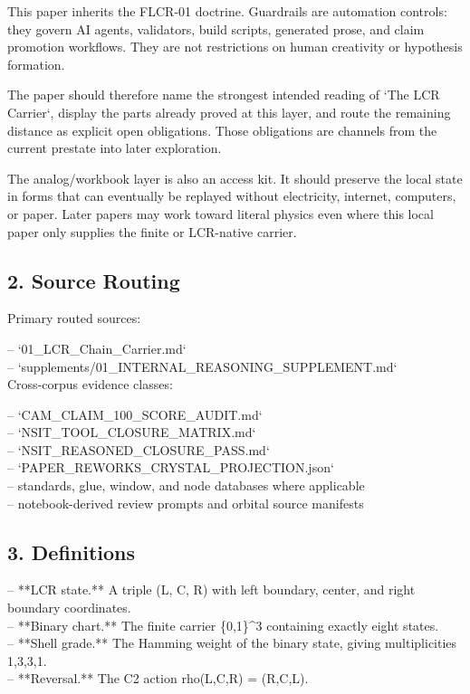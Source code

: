 \documentclass[11pt]{article}
\begin{document}
This paper inherits the FLCR-01 doctrine. Guardrails are automation controls:
they govern AI agents, validators, build scripts, generated prose, and claim
promotion workflows. They are not restrictions on human creativity or
hypothesis formation.

The paper should therefore name the strongest intended reading of `The LCR Carrier`,
display the parts already proved at this layer, and route the remaining
distance as explicit open obligations. Those obligations are channels from the
current prestate into later exploration.

The analog/workbook layer is also an access kit. It should preserve the local
state in forms that can eventually be replayed without electricity, internet,
computers, or paper. Later papers may work toward literal physics even where
this local paper only supplies the finite or LCR-native carrier.

\subsection*{2. Source Routing}

Primary routed sources:

\noindent{}-- `01\_LCR\_Chain\_Carrier.md`\\
\noindent{}-- `supplements/01\_INTERNAL\_REASONING\_SUPPLEMENT.md`\\

Cross-corpus evidence classes:

\noindent{}-- `CAM\_CLAIM\_100\_SCORE\_AUDIT.md`\\
\noindent{}-- `NSIT\_TOOL\_CLOSURE\_MATRIX.md`\\
\noindent{}-- `NSIT\_REASONED\_CLOSURE\_PASS.md`\\
\noindent{}-- `PAPER\_REWORKS\_CRYSTAL\_PROJECTION.json`\\
\noindent{}-- standards, glue, window, and node databases where applicable\\
\noindent{}-- notebook-derived review prompts and orbital source manifests\\

\subsection*{3. Definitions}

\noindent{}-- **LCR state.** A triple (L, C, R) with left boundary, center, and right boundary coordinates.\\
\noindent{}-- **Binary chart.** The finite carrier \{0,1\}\textasciicircum{}3 containing exactly eight states.\\
\noindent{}-- **Shell grade.** The Hamming weight of the binary state, giving multiplicities 1,3,3,1.\\
\noindent{}-- **Reversal.** The C2 action rho(L,C,R) = (R,C,L).\\
\end{document}
